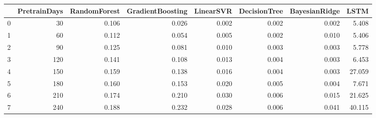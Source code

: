 \begin{tabular}{lrrrrrrr}
\toprule
{} &  PretrainDays &  RandomForest &  GradientBoosting &  LinearSVR &  DecisionTree &  BayesianRidge &   LSTM \\
\midrule
0 &            30 &         0.106 &             0.026 &      0.002 &         0.002 &          0.002 &  5.408 \\
1 &            60 &         0.112 &             0.054 &      0.005 &         0.002 &          0.010 &  5.406 \\
2 &            90 &         0.125 &             0.081 &      0.010 &         0.003 &          0.003 &  5.778 \\
3 &           120 &         0.141 &             0.108 &      0.013 &         0.004 &          0.003 &  6.453 \\
4 &           150 &         0.159 &             0.138 &      0.016 &         0.004 &          0.003 & 27.059 \\
5 &           180 &         0.160 &             0.153 &      0.020 &         0.005 &          0.004 &  7.671 \\
6 &           210 &         0.174 &             0.210 &      0.030 &         0.006 &          0.015 & 21.625 \\
7 &           240 &         0.188 &             0.232 &      0.028 &         0.006 &          0.041 & 40.115 \\
\bottomrule
\end{tabular}
